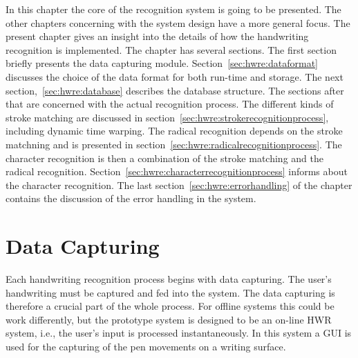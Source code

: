 In this chapter the core of the recognition system is going to be presented.
The other chapters concerning with the system design have a more general focus.
The present chapter gives an insight into the details of how the handwriting
recognition is implemented. The chapter has several sections. The first section
briefly presents the data capturing module. Section~\ref{sec:hwre:dataformat}
discusses the choice of the data format for both run-time and storage.
The next section,~\ref{sec:hwre:database} describes the database structure.
The sections after that are concerned with the actual recognition process.
The different kinds of stroke matching are discussed in 
section~\ref{sec:hwre:strokerecognitionprocess}, including dynamic time warping.
The radical recognition depends on the stroke matchning and is presented in
section~\ref{sec:hwre:radicalrecognitionprocess}.
The character recognition is then a combination of the stroke matching and
the radical recognition. Section~\ref{sec:hwre:characterrecognitionprocess}
informs about the character recognition.
The last section~\ref{sec:hwre:errorhandling} of the chapter contains the 
discussion of the error handling in the system.

\section{Data Capturing}
\label{sec:hwre:datacapturing}

Each handwriting recognition process begins with data capturing.
The user's handwriting must be captured and fed into the system. The data 
capturing is therefore a crucial part of the whole process. 
For offline systems this could be work differently, but the prototype system
is designed to be an on-line HWR system, i.e., the user's input is processed
instantaneously.
In this system a GUI is used for the capturing of the pen movements on a 
writing surface.


